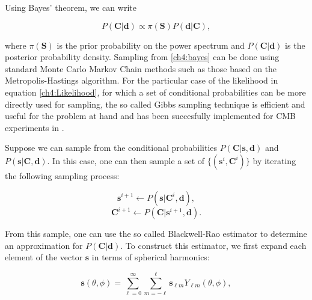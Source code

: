 \documentclass[openany,a4paper,12pt,oneside]{book}
\begin{document}
\begin{spacing}{1.5}
Using Bayes' theorem, we can write

\begin{equation}\label{ch4:bayes}
  P(\mathbf{C}|\mathbf{d})\propto \pi(\mathbf{S})P(\mathbf{d}|\mathbf{C}),
\end{equation}

\noindent where $\pi(\mathbf{S})$ is the prior probability on the power spectrum and $P(\mathbf{C}|\mathbf{d})$ is the posterior probability density. Sampling from \ref{ch4:bayes} can be done using standard Monte Carlo Markov Chain methods such as those based on the Metropolis-Hastings algorithm. For the particular case of the likelihood in equation \ref{ch4:Likelihood}, for which a set of conditional probabilities can be more directly used for sampling, the so called Gibbs sampling technique is efficient and useful for the problem at hand and has been succesfully implemented for CMB experiments in \cite{Jewell_2004,Eriksen_2004,Wandelt_2004, Larson_2007}. 

Suppose we can sample from the conditional probabilities $P(\mathbf{C}|\mathbf{s}, \mathbf{d})$ and $P(\mathbf{s}|\mathbf{C}, \mathbf{d})$. In this case, one can then sample a set of $\{(\mathbf{s}^i, \mathbf{C}^i)\}$ by iterating the following sampling process\cite{Chu_2005}:

\begin{equation}\label{gibbs_sample1}
\mathbf{s}^{i+1}\leftarrow P(\mathbf{s}|\mathbf{C}^i, \mathbf{d}),
\end{equation}
\begin{equation}\label{gibbs_sample2}
\mathbf{C}^{i+1}\leftarrow P(\mathbf{C}|\mathbf{s}^{i+1}, \mathbf{d}).
\end{equation}

From this sample, one can use the so called Blackwell-Rao estimator to determine an approximation for $P(\mathbf{C}|\mathbf{d})$\cite{Chu_2005}. To construct this estimator, we first expand each element of the vector $\mathbf{s}$ in terms of spherical harmonics:


\begin{equation}\label{s_harmonics}
	\mathbf{s}(\theta, \phi)=\sum_{\ell=0}^\infty \sum_{m=-\ell}^\ell \mathbf{s}_{\ell m}Y_{\ell m}(\theta, \phi),
\end{equation}


\end{spacing}
\end{document}
